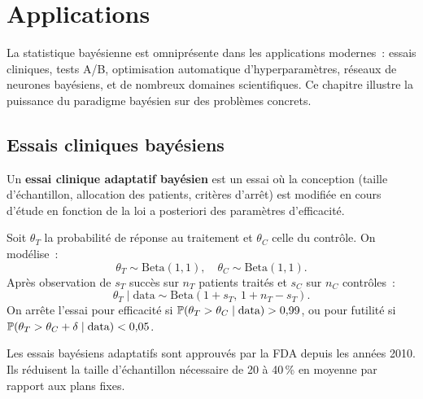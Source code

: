 \chapter{Applications}
\label{ch:applications}

\begin{intuition}[title=\textbf{Id\'ee centrale}]
La statistique bay\'esienne est omnipr\'esente dans les applications modernes~:
essais cliniques, tests A/B, optimisation automatique d'hyperparam\`etres,
r\'eseaux de neurones bay\'esiens, et de nombreux domaines scientifiques.
Ce chapitre illustre la puissance du paradigme bay\'esien sur des probl\`emes
concrets.
\end{intuition}

\section{Essais cliniques bay\'esiens}

\begin{definition}
Un \textbf{essai clinique adaptatif bay\'esien} est un essai o\`u la
conception (taille d'\'echantillon, allocation des patients, crit\`eres
d'arr\^et) est modifi\'ee en cours d'\'etude en fonction de la loi a
posteriori des param\`etres d'efficacit\'e.
\end{definition}

\begin{exemple}
Soit $\theta_T$ la probabilit\'e de r\'eponse au traitement et $\theta_C$
celle du contr\^ole. On mod\'elise~:
\[
  \theta_T \sim \mathrm{Beta}(1, 1), \quad
  \theta_C \sim \mathrm{Beta}(1, 1).
\]
Apr\`es observation de $s_T$ succ\`es sur $n_T$ patients trait\'es et $s_C$
sur $n_C$ contr\^oles~:
\[
  \theta_T \mid \text{data} \sim \mathrm{Beta}(1 + s_T,\, 1 + n_T - s_T).
\]
On arr\^ete l'essai pour efficacit\'e si $\mathbb{P}(\theta_T > \theta_C \mid \text{data}) > 0{,}99$,
ou pour futilit\'e si $\mathbb{P}(\theta_T > \theta_C + \delta \mid \text{data}) < 0{,}05$.
\end{exemple}

\begin{remarque}
Les essais bay\'esiens adaptatifs sont approuv\'es par la FDA depuis les
ann\'ees 2010. Ils r\'eduisent la taille d'\'echantillon n\'ecessaire de
20 \`a 40\,\% en moyenne par rapport aux plans fixes.
\end{remarque}

